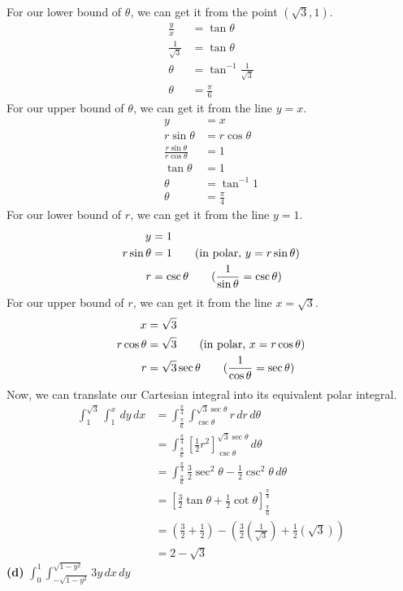 \documentclass{article}
\newcommand{\lrp}[1]{\left( #1 \right)}
\newcommand{\lrb}[1]{\left[ #1 \right]}
\begin{document}
For our lower bound of $\theta$, we can get it from the point $\displaystyle \lrp{\sqrt{3}, 1}$.
\begin{align*}
    \frac{y}{x}&=\tan \theta\\
\frac{1}{\sqrt{3}}&=\tan \theta \\
\theta &= \tan^{-1}\frac{1}{\sqrt{3}}\\
\theta &= \frac{\pi}{6}
\end{align*}
For our upper bound of $\theta$, we can get it from the line $y=x$.
\begin{align*}
    y&=x\\
    r\sin \theta &= r\cos\theta\\
    \frac{r\sin\theta}{r\cos\theta} &= 1\\
    \tan \theta &= 1\\
    \theta &= \tan^{-1}1\\
    \theta &= \frac{\pi}{4}
\end{align*}
For our lower bound of $r$, we can get it from the line $y=1$.
\begin{align*}
    y&=1\\
    r\sin\theta&=1\tag{in polar, $y=r\sin\theta$}\\
    r&=\csc\theta\tag{$\dfrac{1}{\sin\theta}=\csc\theta$}
\end{align*}
For our upper bound of $r$, we can get it from the line $x=\sqrt{3}$.
\begin{align*}
    x&=\sqrt{3}\\
    r\cos\theta&=\sqrt{3}\tag{in polar, $x=r\cos\theta$}\\
    r&=\sqrt{3}\sec\theta\tag{$\dfrac{1}{\cos\theta}=\sec\theta$}
\end{align*}
Now, we can translate our Cartesian integral into its equivalent polar integral.
\begin{align*}
    \int_1^{\sqrt{3}}\int_1^x\,dy\,dx&=\int_{\frac{\pi}{6}}^{\frac{\pi}{4}}\int_{\csc\theta}^{\sqrt{3}\sec\theta}r\,dr\,d\theta\\
    &=\int_{\frac{\pi}{6}}^{\frac{\pi}{4}}\lrb{\frac{1}{2}r^2}_{\csc\theta}^{\sqrt{3}\sec\theta}\,d\theta\\
    &=\int_{\frac{\pi}{6}}^{\frac{\pi}{4}} \frac{3}{2}\sec^2\theta -\frac{1}{2}\csc^2\theta\,d\theta\\
    &=\lrb{\frac{3}{2}\tan\theta+\frac{1}{2}\cot\theta}_{\frac{\pi}{6}}^{\frac{\pi}{4}}\\
    &=\lrp{\frac{3}{2}+\frac{1}{2}}-\lrp{\frac{3}{2}\lrp{\frac{1}{\sqrt{3}}}+\frac{1}{2}\lrp{\sqrt{3}}}\\
    &=\boxed{2-\sqrt{3}}
\end{align*}
\textbf{(d)} $\displaystyle \int_0^{1}\int_{-\sqrt{1-y^2}}^{\sqrt{1-y^2}}3y\,dx\,dy$
\end{document}
